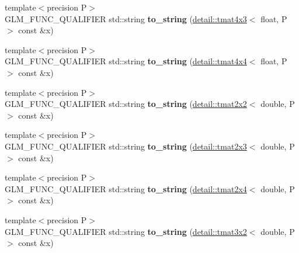 \begin{DoxyCompactItemize}
\item 
{\footnotesize template$<$precision P$>$ }\\G\+L\+M\+\_\+\+F\+U\+N\+C\+\_\+\+Q\+U\+A\+L\+I\+F\+I\+ER std\+::string {\bfseries to\+\_\+string} (\hyperlink{structglm_1_1detail_1_1tmat4x3}{detail\+::tmat4x3}$<$ float, P $>$ const \&x)\hypertarget{namespaceglm_aee13f0a6be949ae51bdc9488374b3182}{}\label{namespaceglm_aee13f0a6be949ae51bdc9488374b3182}

\item 
{\footnotesize template$<$precision P$>$ }\\G\+L\+M\+\_\+\+F\+U\+N\+C\+\_\+\+Q\+U\+A\+L\+I\+F\+I\+ER std\+::string {\bfseries to\+\_\+string} (\hyperlink{structglm_1_1detail_1_1tmat4x4}{detail\+::tmat4x4}$<$ float, P $>$ const \&x)\hypertarget{namespaceglm_a8603079aa7490861bd0d069fb9539ea4}{}\label{namespaceglm_a8603079aa7490861bd0d069fb9539ea4}

\item 
{\footnotesize template$<$precision P$>$ }\\G\+L\+M\+\_\+\+F\+U\+N\+C\+\_\+\+Q\+U\+A\+L\+I\+F\+I\+ER std\+::string {\bfseries to\+\_\+string} (\hyperlink{structglm_1_1detail_1_1tmat2x2}{detail\+::tmat2x2}$<$ double, P $>$ const \&x)\hypertarget{namespaceglm_a7d97d16b88df8cabe0fd352a3f7cbc67}{}\label{namespaceglm_a7d97d16b88df8cabe0fd352a3f7cbc67}

\item 
{\footnotesize template$<$precision P$>$ }\\G\+L\+M\+\_\+\+F\+U\+N\+C\+\_\+\+Q\+U\+A\+L\+I\+F\+I\+ER std\+::string {\bfseries to\+\_\+string} (\hyperlink{structglm_1_1detail_1_1tmat2x3}{detail\+::tmat2x3}$<$ double, P $>$ const \&x)\hypertarget{namespaceglm_a7d107a659954f00ea723ce93beef4d3f}{}\label{namespaceglm_a7d107a659954f00ea723ce93beef4d3f}

\item 
{\footnotesize template$<$precision P$>$ }\\G\+L\+M\+\_\+\+F\+U\+N\+C\+\_\+\+Q\+U\+A\+L\+I\+F\+I\+ER std\+::string {\bfseries to\+\_\+string} (\hyperlink{structglm_1_1detail_1_1tmat2x4}{detail\+::tmat2x4}$<$ double, P $>$ const \&x)\hypertarget{namespaceglm_af5a211cd0d2ae100217f01efcfcc3a64}{}\label{namespaceglm_af5a211cd0d2ae100217f01efcfcc3a64}

\item 
{\footnotesize template$<$precision P$>$ }\\G\+L\+M\+\_\+\+F\+U\+N\+C\+\_\+\+Q\+U\+A\+L\+I\+F\+I\+ER std\+::string {\bfseries to\+\_\+string} (\hyperlink{structglm_1_1detail_1_1tmat3x2}{detail\+::tmat3x2}$<$ double, P $>$ const \&x)\hypertarget{namespaceglm_acab2e86e3e8b184152c82bde39a9da6a}{}\label{namespaceglm_acab2e86e3e8b184152c82bde39a9da6a}


\end{DoxyCompactItemize}
